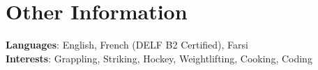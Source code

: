 \documentclass[letterpaper,11pt]{article}
\begin{document}
\section{Other Information}
 \begin{itemize}[leftmargin=0.15in, label={}]
    \small{\item{
     \textbf{Languages}{: English, French (DELF B2 Certified), Farsi} \\
     \textbf{Interests}{: Grappling, Striking, Hockey, Weightlifting, Cooking, Coding}
    }}
 \end{itemize}





 
\end{document}
